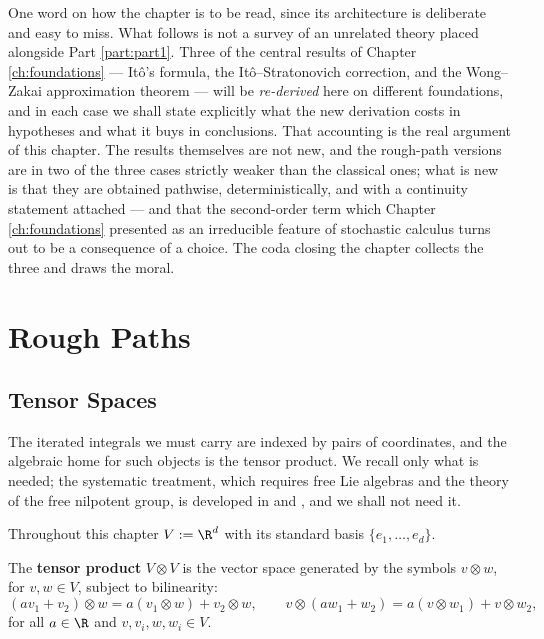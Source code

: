 One word on how the chapter is to be read, since its architecture is deliberate and easy to miss.
What follows is not a survey of an unrelated theory placed alongside Part \ref{part:part1}. Three of
the central results of Chapter \ref{ch:foundations} --- Itô's formula, the Itô--Stratonovich
correction, and the Wong--Zakai approximation theorem --- will be \emph{re-derived} here on
different foundations, and in each case we shall state explicitly what the new derivation costs in
hypotheses and what it buys in conclusions. That accounting is the real argument of this chapter.
The results themselves are not new, and the rough-path versions are in two of the three cases
strictly weaker than the classical ones; what is new is that they are obtained pathwise,
deterministically, and with a continuity statement attached --- and that the second-order term which
Chapter \ref{ch:foundations} presented as an irreducible feature of stochastic calculus turns out to
be a consequence of a choice. The coda closing the chapter collects the three and draws the moral.

\section{Rough Paths}\label{sec:roughpaths}

\subsection{Tensor Spaces}\label{subsec:tensorspaces}

The iterated integrals we must carry are indexed by pairs of coordinates, and the algebraic home
for such objects is the tensor product. We recall only what is needed; the systematic treatment,
which requires free Lie algebras and the theory of the free nilpotent group, is developed in
\cite[Ch.\ 3]{geng2021} and \cite[Ch.\ 7]{frizvictoir2010}, and we shall not need it.

Throughout this chapter $V := \R^d$ with its standard basis $\{e_1,\dots,e_d\}$.

\begin{definition}\label{def:tensorproduct}
The \textbf{tensor product} $V \otimes V$ is the vector space generated by the symbols
$v \otimes w$, for $v,w \in V$, subject to bilinearity:
\begin{equation}\label{eq:bilinearity}
(av_1 + v_2)\otimes w = a(v_1\otimes w) + v_2 \otimes w, \qquad
v \otimes (aw_1 + w_2) = a(v\otimes w_1) + v\otimes w_2 ,
\end{equation}
for all $a \in \R$ and $v,v_i,w,w_i \in V$.
\end{definition}

